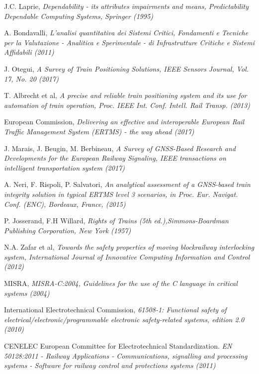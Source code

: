 \begin{thebibliography}{9}
J.C. Laprie, \textit{Dependability - its attributes impairments and means, Predictability Dependable Computing Systems, Springer (1995)}

A. Bondavalli, \textit{L'analisi quantitativa dei Sistemi Critici, Fondamenti e Tecniche per la Valutazione - Analitica e Sperimentale - di Infrastrutture Critiche e Sistemi Affidabili (2011)}

J. Otegui, \textit{A Survey of Train Positioning Solutions, IEEE Sensors Journal, Vol. 17, No. 20 (2017)}

T. Albrecht et al, \textit{A precise and reliable train positioning system and its use for automation of train
operation, Proc. IEEE Int. Conf. Intell. Rail Transp. (2013)}

European Commission, \textit{
	Delivering an effective and interoperable European Rail Traffic Management System
	(ERTMS) - the way ahead (2017)}

J. Marais, J. Beugin, M. Berbineau, \textit{A Survey of GNSS-Based Research and
	Developments for the European Railway Signaling, IEEE transactions on intelligent transportation system (2017)}

A. Neri, F. Rispoli, P. Salvatori, \textit{An analytical assessment of
a GNSS-based train integrity solution in typical ERTMS level 3
scenarios, in Proc. Eur. Navigat. Conf. (ENC), Bordeaux, France, (2015)}

 P. Josserand, F.H Willard, \textit{Rights of Trains (5th ed.),Simmons-Boardman Publishing Corporation, New York (1957)}
 
N.A. Zafar et al, \textit{Towards the safety properties of moving blockrailway interlocking system, International Journal of Innovative Computing Information and Control (2012)}

MISRA, \textit{MISRA-C:2004, Guidelines for the use of the C language in critical systems (2004)}

International Electrotechnical Commission, \textit{61508-1: Functional safety of electrical/electronic/programmable electronic safety-related systems, edition 2.0 (2010)}


CENELEC European Committee for Electrotechnical Standardization. \textit{EN 50128:2011 - Railway Applications - Communications, signalling and processing systems - Software for railway control and protections systems (2011)}


\end{thebibliography}
